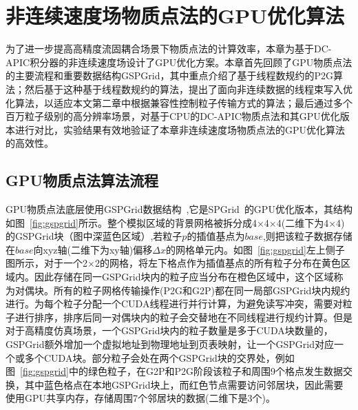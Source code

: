 
\chapter{非连续速度场物质点法的GPU优化算法}
为了进一步提高高精度流固耦合场景下物质点法的计算效率，本章为基于DC-APIC积分器的非连续速度场设计了GPU优化方案。本章首先回顾了GPU物质点法的主要流程和重要数据结构GSPGrid，其中重点介绍了基于线程数规约的P2G算法；然后基于这种基于线程数规约的算法，提出了面向非连续数据的线程束写入优化算法，以适应本文第二章中根据兼容性控制粒子传输方式的算法；最后通过多个百万粒子级别的高分辨率场景，对基于CPU的DC-APIC物质点法和其GPU优化版本进行对比，实验结果有效地验证了本章非连续速度场物质点法的GPU优化算法的高效性。

\section{GPU物质点法算法流程}
GPU物质点法底层使用GSPGrid数据结构~\cite{gpumpm},它是SPGrid~\cite{setaluri2014spgrid}的GPU优化版本，其结构如图~\ref{fig:gspgrid}所示。整个模拟区域的背景网格被拆分成4$\times$4$\times$4(二维下为4$\times$4)的GSPGrid块（图中深蓝色区域）,若粒子$p$的插值基点为$base$,则把该粒子数据存储在$base$向xyz轴(二维下为xy轴)偏移$\Delta x$的网格单元内。如图~\ref{fig:gspgrid}左上侧子图所示，对于一个2$\times$2的网格，将左下格点作为插值基点的所有粒子分布在黄色区域内。因此存储在同一GSPGrid块内的粒子应当分布在橙色区域中，这个区域称为对偶块。所有的粒子网格传输操作(P2G和G2P)都在同一局部GSPGrid块内规约进行。为每个粒子分配一个CUDA线程进行并行计算，为避免读写冲突，需要对粒子进行排序，排序后同一对偶块内的粒子会交替地在不同线程进行规约计算。但是对于高精度仿真场景，一个GSPGrid块内的粒子数量是多于CUDA块数量的，GSPGrid额外增加一个虚拟地址到物理地址到页表映射，让一个GSPGrid对应一个或多个CUDA块。部分粒子会处在两个GSPGrid块的交界处，例如图~\ref{fig:gspgrid}中的绿色粒子，在G2P和P2G阶段该粒子和周围9个格点发生数据交换，其中蓝色格点在本地GSPGrid块上，而红色节点需要访问邻居块，因此需要使用GPU共享内存，存储周围7个邻居块的数据(二维下是3个)。

